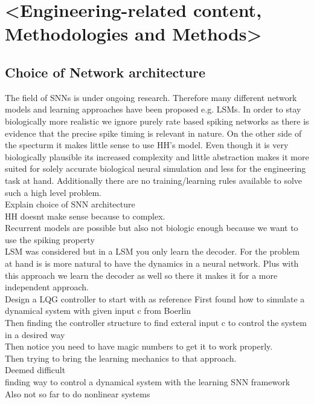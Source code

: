\chapter{<Engineering-related content, Methodologies and Methods>}



\section{Choice of Network architecture}

The field of \acp{SNN} is under ongoing research. Therefore many different network models and learning approaches have been proposed e.g. \acp{LSM}\cite{dewolf_spiking_2016}. In order to stay biologically more realistic we ignore purely rate based spiking networks as there is evidence that the precise spike timing is relevant in nature\cite{brette_philosophy_2015}\cite{putney_precise_2019}.
On the other side of the specturm it makes little sense to use \ac{HH}'s model. Even though it is very biologically plausible its increased complexity and little abstraction makes it more suited for solely accurate biological neural simulation and less for the engineering task at hand. Additionally there are no training/learning rules available to solve such a high level problem.\\


Explain choice of SNN architecture\\
HH doesnt make sense because to complex.\\
Recurrent models are possible but also not biologic enough because we want to use the spiking property\\
LSM was considered but in a LSM you only learn the decoder. For the problem at hand is is more natural to have the dynamics in a neural network. Plus with this approach we learn the decoder as well so there it makes it for a more independent approach.\\



Design a LQG controller to start with as reference
First found how to simulate a dynamical system with given input c from Boerlin\\
Then finding the controller structure to find exteral input c to control the system in a desired way\\
Then notice you need to have magic numbers to get it to work properly.\\
Then trying to bring the learning mechanics to that approach.\\
Deemed difficult\\
finding way to control a dynamical system with the learning SNN framework\\
Also not so far to do nonlinear systems\\


